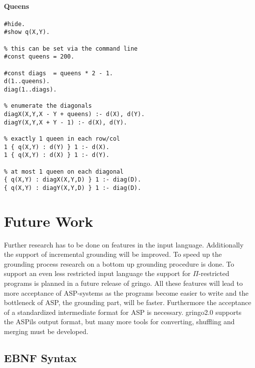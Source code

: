 \documentclass[a4paper,10pt]{article}
\begin{document}
\paragraph{Queens}
\begin{verbatim}
#hide.
#show q(X,Y).

% this can be set via the command line
#const queens = 200.

#const diags  = queens * 2 - 1.
d(1..queens).
diag(1..diags).

% enumerate the diagonals
diagX(X,Y,X - Y + queens) :- d(X), d(Y).
diagY(X,Y,X + Y - 1) :- d(X), d(Y).

% exactly 1 queen in each row/col
1 { q(X,Y) : d(Y) } 1 :- d(X).
1 { q(X,Y) : d(X) } 1 :- d(Y).

% at most 1 queen on each diagonal
{ q(X,Y) : diagX(X,Y,D) } 1 :- diag(D).
{ q(X,Y) : diagY(X,Y,D) } 1 :- diag(D).

\end{verbatim}


%
\section{Future Work}
Further research has to be done on features in the input language. Additionally the support of incremental grounding will be improved. To speed up the grounding process research on a bottom up grounding procedure is done. To support an even less restricted input language the support for $\Pi$-restricted programs is planned in a future release of gringo. All these features will lead to more acceptance of ASP-systems as the programs become easier to write and the bottleneck of ASP, the grounding part, will be faster.
Furthermore the acceptance of a standardized intermediate format for ASP is necessary. gringo2.0 supports the ASPils output format, but many more tools for converting, shuffling and merging must be developed.
\newpage
\textbf{\appendixname}
\begin{appendix}
\section{EBNF Syntax}
\label{appendix}

\end{appendix}



\appendix
\end{document}

